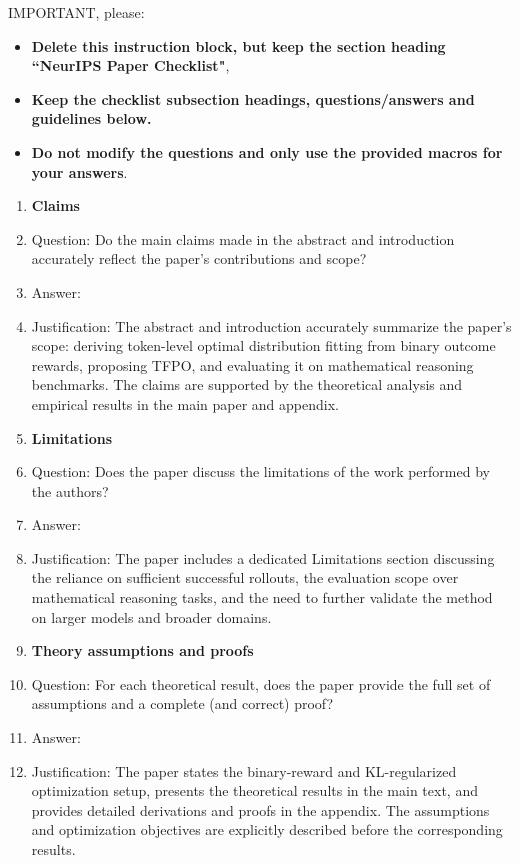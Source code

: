 IMPORTANT, please:
\begin{itemize}
    \item {\bf Delete this instruction block, but keep the section heading ``NeurIPS Paper Checklist"},
    \item  {\bf Keep the checklist subsection headings, questions/answers and guidelines below.}
    \item {\bf Do not modify the questions and only use the provided macros for your answers}.
\end{itemize} 
 



\begin{enumerate}

\item {\bf Claims}
    \item[] Question: Do the main claims made in the abstract and introduction accurately reflect the paper's contributions and scope?
    \item[] Answer: \answerYes{}
    \item[] Justification: The abstract and introduction accurately summarize the paper's scope: deriving token-level optimal distribution fitting from binary outcome rewards, proposing TFPO, and evaluating it on mathematical reasoning benchmarks. The claims are supported by the theoretical analysis and empirical results in the main paper and appendix.

\item {\bf Limitations}
    \item[] Question: Does the paper discuss the limitations of the work performed by the authors?
    \item[] Answer: \answerYes{}
    \item[] Justification: The paper includes a dedicated Limitations section discussing the reliance on sufficient successful rollouts, the evaluation scope over mathematical reasoning tasks, and the need to further validate the method on larger models and broader domains.

\item {\bf Theory assumptions and proofs}
    \item[] Question: For each theoretical result, does the paper provide the full set of assumptions and a complete (and correct) proof?
    \item[] Answer: \answerYes{}
    \item[] Justification: The paper states the binary-reward and KL-regularized optimization setup, presents the theoretical results in the main text, and provides detailed derivations and proofs in the appendix. The assumptions and optimization objectives are explicitly described before the corresponding results.


\end{enumerate}
